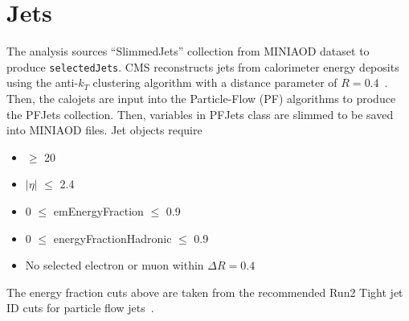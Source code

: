 \section{Jets}\label{sec:jets}
The analysis sources ``SlimmedJets'' collection from MINIAOD dataset to produce {\tt selectedJets}.
CMS reconstructs jets from calorimeter energy deposits using the
anti-$k_T$ clustering algorithm with a distance parameter of $R=0.4$~\cite{Cacciari:2008gp}.
Then, the calojets are input into the Particle-Flow (PF) algorithms to produce the PFJets collection. Then, variables in PFJets class are slimmed to be saved into MINIAOD files.
Jet objects require
\begin{itemize}
  \item \pt $\geq$ 20\GeV
  \item $|\eta|$ $\leq$ 2.4
  \item 0 $\leq$ emEnergyFraction $\leq$ 0.9
  \item 0 $\leq$ energyFractionHadronic $\leq$ 0.9
  \item No selected electron or muon within $\Delta R=0.4$
\end{itemize}
The energy fraction cuts above are taken from the recommended Run2 Tight jet ID
cuts for particle flow jets~\cite{jetid_2018}.
